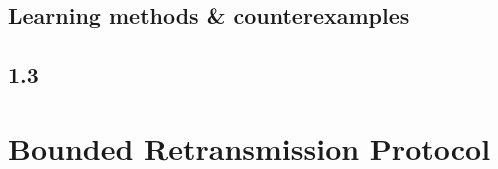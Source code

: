 \documentclass[11pt,a4paper]{article}
\begin{document}
\subsection{Learning methods \& counterexamples}





\subsection{1.3}



\section{Bounded Retransmission Protocol}
\end{document}
